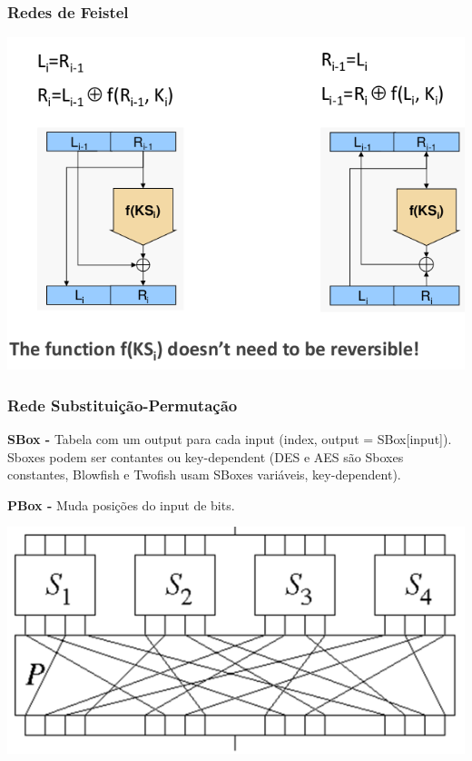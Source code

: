 \documentclass{article}
\begin{document}
\pagebreak

\subsubsection{Redes de Feistel}

\begin{center}
  \includegraphics[scale=0.3]{77}
\end{center}

\subsubsection{Rede Substituição-Permutação}

\begin{flushleft}
  \textbf{SBox -} Tabela com um output para cada input (index, output = SBox[input]).
  Sboxes podem ser contantes ou key-dependent (DES e AES são Sboxes constantes,
  Blowfish e Twofish usam SBoxes variáveis, key-dependent).

  \vspace{2mm}

  \textbf{PBox -} Muda posições do input de bits.
\end{flushleft}

\begin{center}
  \includegraphics[scale=0.3]{78}
\end{center}
\end{document}
